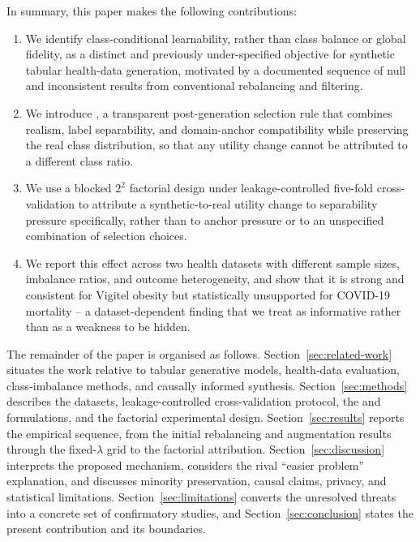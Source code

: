 In summary, this paper makes the following contributions:
\begin{enumerate}[leftmargin=*]
\item We identify class-conditional learnability, rather than class balance or global fidelity, as a distinct and previously under-specified objective for synthetic tabular health-data generation, motivated by a documented sequence of null and inconsistent results from conventional rebalancing and filtering.
\item We introduce \sepa{}, a transparent post-generation selection rule that combines realism, label separability, and domain-anchor compatibility while preserving the real class distribution, so that any utility change cannot be attributed to a different class ratio.
\item We use a blocked $2^2$ factorial design under leakage-controlled five-fold cross-validation to attribute a synthetic-to-real utility change to separability pressure specifically, rather than to anchor pressure or to an unspecified combination of selection choices.
\item We report this effect across two health datasets with different sample sizes, imbalance ratios, and outcome heterogeneity, and show that it is strong and consistent for Vigitel obesity but statistically unsupported for COVID-19 mortality -- a dataset-dependent finding that we treat as informative rather than as a weakness to be hidden.
\end{enumerate}

The remainder of the paper is organised as follows. Section~\ref{sec:related-work} situates the work relative to tabular generative models, health-data evaluation, class-imbalance methods, and causally informed synthesis. Section~\ref{sec:methods} describes the datasets, leakage-controlled cross-validation protocol, the \sepa{} and \dacpf{} formulations, and the factorial experimental design. Section~\ref{sec:results} reports the empirical sequence, from the initial rebalancing and augmentation results through the fixed-$\lambda$ grid to the factorial attribution. Section~\ref{sec:discussion} interprets the proposed mechanism, considers the rival ``easier problem'' explanation, and discusses minority preservation, causal claims, privacy, and statistical limitations. Section~\ref{sec:limitations} converts the unresolved threats into a concrete set of confirmatory studies, and Section~\ref{sec:conclusion} states the present contribution and its boundaries.
